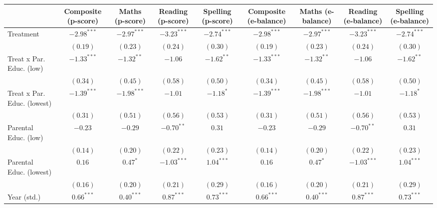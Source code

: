 
\begin{table}
\begin{center}
\begin{tabular}{l c c c c c c c c}
\hline
 & Composite (p-score) & Maths (p-score) & Reading (p-score) & Spelling (p-score) & Composite (e-balance) & Maths (e-balance) & Reading (e-balance) & Spelling (e-balance) \\
\hline
Treatment                   & $-2.98^{***}$ & $-2.97^{***}$ & $-3.23^{***}$ & $-2.74^{***}$ & $-2.98^{***}$ & $-2.97^{***}$ & $-3.23^{***}$ & $-2.74^{***}$ \\
                            & $(0.19)$      & $(0.23)$      & $(0.24)$      & $(0.30)$      & $(0.19)$      & $(0.23)$      & $(0.24)$      & $(0.30)$      \\
Treat x Par. Educ. (low)    & $-1.33^{***}$ & $-1.32^{**}$  & $-1.06$       & $-1.62^{**}$  & $-1.33^{***}$ & $-1.32^{**}$  & $-1.06$       & $-1.62^{**}$  \\
                            & $(0.34)$      & $(0.45)$      & $(0.58)$      & $(0.50)$      & $(0.34)$      & $(0.45)$      & $(0.58)$      & $(0.50)$      \\
Treat x Par. Educ. (lowest) & $-1.39^{***}$ & $-1.98^{***}$ & $-1.01$       & $-1.18^{*}$   & $-1.39^{***}$ & $-1.98^{***}$ & $-1.01$       & $-1.18^{*}$   \\
                            & $(0.31)$      & $(0.51)$      & $(0.56)$      & $(0.53)$      & $(0.31)$      & $(0.51)$      & $(0.56)$      & $(0.53)$      \\
Parental Educ. (low)        & $-0.23$       & $-0.29$       & $-0.70^{**}$  & $0.31$        & $-0.23$       & $-0.29$       & $-0.70^{**}$  & $0.31$        \\
                            & $(0.14)$      & $(0.20)$      & $(0.22)$      & $(0.23)$      & $(0.14)$      & $(0.20)$      & $(0.22)$      & $(0.23)$      \\
Parental Educ. (lowest)     & $0.16$        & $0.47^{*}$    & $-1.03^{***}$ & $1.04^{***}$  & $0.16$        & $0.47^{*}$    & $-1.03^{***}$ & $1.04^{***}$  \\
                            & $(0.16)$      & $(0.20)$      & $(0.21)$      & $(0.29)$      & $(0.16)$      & $(0.20)$      & $(0.21)$      & $(0.29)$      \\
Year (std.)                 & $0.66^{***}$  & $0.40^{***}$  & $0.87^{***}$  & $0.73^{***}$  & $0.66^{***}$  & $0.40^{***}$  & $0.87^{***}$  & $0.73^{***}$  \\

\end{tabular}
\end{center}
\end{table}

